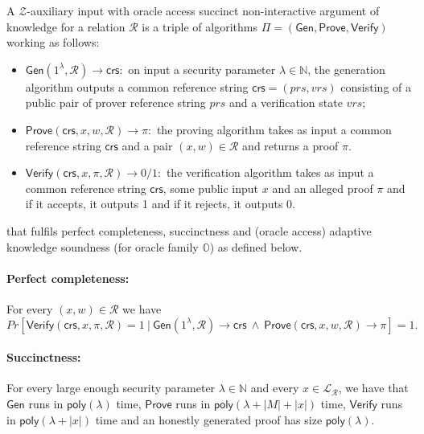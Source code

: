 \begin{definition}
\label{def:osnarks}
A $\mathcal{Z}$-auxiliary input with oracle access succinct non-interactive argument of knowledge for a relation $\mathcal{R}$ 
is a triple of algorithms $\Pi=(\mathsf{Gen}, \mathsf{Prove}, \mathsf{Verify})$ working as follows:
\begin{itemize}
\item $\mathsf{Gen}(1^{\lambda},\mathcal{R}) \rightarrow \mathsf{crs}:$ 
on input a security parameter $\lambda \in \mathbb{N}$, the generation algorithm outputs
a common reference string $\mathsf{crs} = (\mathit{prs},\mathit{vrs})$ 
consisting of a public pair of prover reference string $\mathit{prs}$ and a verification state $\mathit{vrs}$;
\item $\mathsf{Prove}(\mathsf{crs}, x, w, \mathcal{R}) \rightarrow \pi:$ the proving algorithm takes as input 
a common reference string $\mathsf{crs}$ and a pair $(x,w) \in \mathcal{R}$ and returns a proof $\pi$. 
\item $\mathsf{Verify}(\mathsf{crs}, x, \pi, \mathcal{R}) \rightarrow 0/1:$ the verification algorithm takes as input 
a common reference string $\mathsf{crs}$, some public input $x$ and an alleged proof $\pi$ and if it accepts, 
it outputs 1 and if it rejects, it outputs 0. 
\end{itemize}
\noindent that fulfils perfect completeness, succinctness and (oracle access) adaptive knowledge soundness (for oracle family $\mathbb{O}$) as defined below.

\paragraph{Perfect completeness:} For every $(x,w) \in \mathcal{R}$ we have
$$\mathit{Pr}[ \mathsf{Verify}(\mathsf{crs}, x, \pi, \mathcal{R})=1 \  | \  \mathsf{Gen}(1^{\lambda},\mathcal{R}) \rightarrow \mathsf{crs} \ \wedge \  \mathsf{Prove}(\mathsf{crs}, x, w, \mathcal{R}) \rightarrow \pi ] = 1. $$

\paragraph{Succinctness:} For every large enough security parameter $\lambda \in \mathbb{N}$ 
and every $x \in \mathcal{L}_{\mathcal{R}}$, we have that 
$\mathsf{Gen}$ runs in $\mathsf{poly}(\lambda)$ time, $\mathsf{Prove}$ runs in $\mathsf{poly}(\lambda + |M|+ |x|)$ time,  
$\mathsf{Verify}$ runs in $\mathsf{poly}(\lambda + |x|)$ time and an honestly generated proof has size $\mathsf{poly}(\lambda)$. 

\end{definition}
